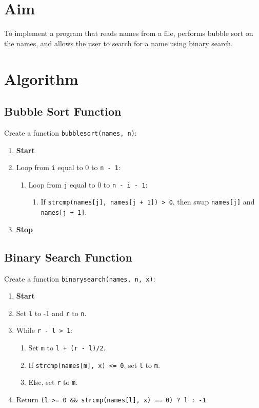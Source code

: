 
\section{Aim}
To implement a program that reads names from a file, performs bubble sort on the names, and allows the user to search for a name using binary search.

\section{Algorithm}
 {\selectfont

  \subsection{Bubble Sort Function}
  Create a function \texttt{bubblesort(names, n)}:
  \begin{enumerate}[label=\arabic*:,left=0pt]
    \item \textbf{Start}
    \item Loop from \texttt{i} equal to 0 to \texttt{n - 1}:
          \begin{enumerate}[label=2.\arabic*:, start=1]
            \item Loop from \texttt{j} equal to 0 to \texttt{n - i - 1}:
                  \begin{enumerate}[label=2.1.\arabic*:, start=1]
                    \item If \texttt{strcmp(names[j], names[j + 1]) > 0}, then swap \texttt{names[j]} and \texttt{names[j + 1]}.
                  \end{enumerate}
          \end{enumerate}
    \item \textbf{Stop}
  \end{enumerate}

  \subsection{Binary Search Function}
  Create a function \texttt{binarysearch(names, n, x)}:
  \begin{enumerate}[label=\arabic*:,left=0pt]
    \item \textbf{Start}
    \item Set \texttt{l} to -1 and \texttt{r} to \texttt{n}.
    \item While \texttt{r - l > 1}:
          \begin{enumerate}[label=2.\arabic*:, start=1]
            \item Set \texttt{m} to \texttt{l + (r - l)/2}.
            \item If \texttt{strcmp(names[m], x) <= 0}, set \texttt{l} to \texttt{m}.
            \item Else, set \texttt{r} to \texttt{m}.
          \end{enumerate}
    \item Return \texttt{(l >= 0 \&\& strcmp(names[l], x) == 0) ? l : -1}.


\end{enumerate}}
